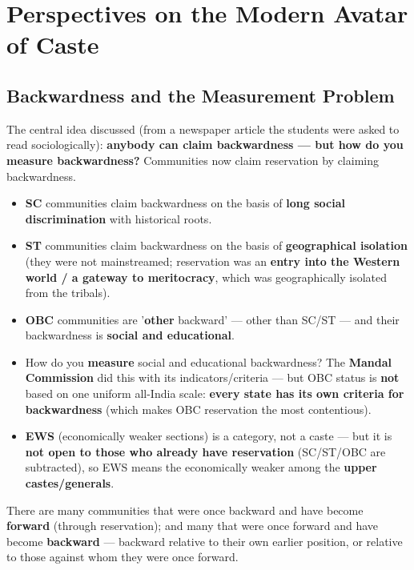 \chapter{Perspectives on the Modern Avatar of Caste}

\section{Backwardness and the Measurement Problem}

The central idea discussed (from a newspaper article the students were asked to read sociologically): \textbf{anybody can claim backwardness --- but how do you measure backwardness?} Communities now claim reservation by claiming backwardness.

\begin{KeyConcept}
\begin{itemize}
\item \textbf{SC} communities claim backwardness on the basis of \textbf{long social discrimination} with historical roots.
\item \textbf{ST} communities claim backwardness on the basis of \textbf{geographical isolation} (they were not mainstreamed; reservation was an \textbf{entry into the Western world / a gateway to meritocracy}, which was geographically isolated from the tribals).
\item \textbf{OBC} communities are '\textbf{other} backward' --- other than SC/ST --- and their backwardness is \textbf{social and educational}.
\item How do you \textbf{measure} social and educational backwardness? The \textbf{Mandal Commission} did this with its indicators/criteria --- but OBC status is \textbf{not} based on one uniform all-India scale: \textbf{every state has its own criteria for backwardness} (which makes OBC reservation the most contentious).
\item \textbf{EWS} (economically weaker sections) is a category, not a caste --- but it is \textbf{not open to those who already have reservation} (SC/ST/OBC are subtracted), so EWS means the economically weaker among the \textbf{upper castes/generals}.
\end{itemize}
\end{KeyConcept}

\begin{KeyConcept}
There are many communities that were once backward and have become \textbf{forward} (through reservation); and many that were once forward and have become \textbf{backward} --- backward relative to their own earlier position, or relative to those against whom they were once forward.
\end{KeyConcept}

